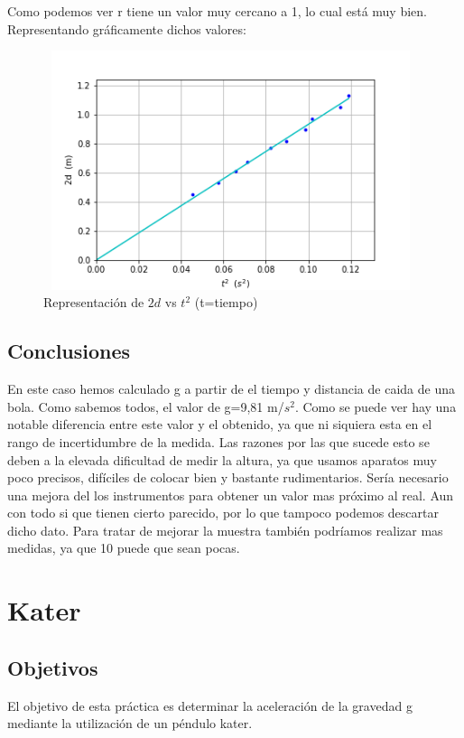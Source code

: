 \documentclass[12pt,a4paper]{book}
\begin{document}
Como podemos ver r tiene un valor muy cercano a 1, lo cual está muy bien. Representando gráficamente dichos valores: 



\begin{figure}[h!] %
\centering
\includegraphics[width=11cm, height=7cm]{Plot1-caidalibre.png}
\caption{Representación de $2d$ vs $t^2$ (t=tiempo)}
\label{fig:Plot1-caidalibre}
\end{figure}


\section{Conclusiones}
En este caso hemos calculado g a partir de el tiempo y distancia de caida de una bola. Como sabemos todos, el valor de g=9,81 m/$s^2$. Como se puede ver hay una notable diferencia entre este valor y el obtenido, ya que ni siquiera esta en el rango de incertidumbre de la medida. Las razones por las que sucede esto se deben a la elevada dificultad de medir la altura, ya que usamos aparatos muy poco precisos, difíciles de colocar bien y bastante rudimentarios. Sería necesario una mejora del los instrumentos para obtener un valor mas próximo al real. Aun con todo si que tienen cierto parecido, por lo que tampoco podemos descartar dicho dato. Para tratar de mejorar la muestra también podríamos realizar mas medidas, ya que 10 puede que sean pocas. 





\chapter{Kater} \newpage

\section{Objetivos}
El objetivo de esta práctica es determinar la aceleración de la gravedad g mediante la utilización de un péndulo kater.
\end{document}
